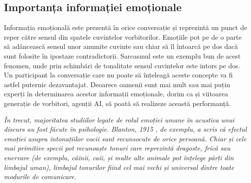 \documentclass[a4paper,12pt]{book}
\begin{document}
			\subsection{Importanța informației emoționale}
				Informația emoțională este prezentă în orice conversație și reprezintă un punct de reper către sensul din spatele cuvintelor vorbitorilor. Emoțiile pot pe de o parte să adâncească sensul unor anumite cuvinte sau chiar să îl întoarcă pe dos dacă sunt folosite în ipostaze contradictorii. Sarcasmul este un exemplu bun de acest fenomen, unde prin schimbări de tonalitate sensul cuvintelor este intors pe dos. Un participant la conversație care nu poate să înțeleagă aceste concepte va fi astfel puternic dezavantajat. Deoarece oamenii sunt mai mult sau mai puțin experți în determinarea acestor informații emoționale, dorim ca și viitoarea generație de vorbitori, agenții AI, să poată să realizeze această performanță.\par
			\textit{În trecut, majoritatea studiilor legate de rolul emoției umane în acustica unui discurs au fost făcute în psihologie. Blanton, 1915 \cite{blanton}, de exemplu, a scris că efectul emoției asupra intonațiilor vocii sunt recunsocute de orice persoană. Chiar și cele mai primitive specii pot recunoaște tonuri care reprezintă dragoste, frică sau enervare (de exemplu, câinii, caii, și multe alte animale pot înțelege părți din limbajul uman), limbajul tonurilor fiind cel mai vechi și universal dintre toate modurile de comunicare.}\par 
\end{document}
